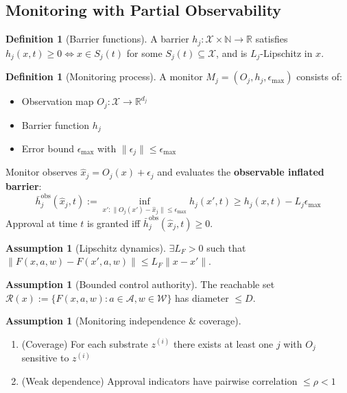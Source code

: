 \documentclass[11pt,a4paper]{article}
\theoremstyle{definition}
\newtheorem{definition}[theorem]{Definition}
\newtheorem{assumption}[theorem]{Assumption}
\newcommand{\R}{\mathbb{R}}
\newcommand{\N}{\mathbb{N}}
\newcommand{\X}{\mathcal{X}}
\newcommand{\A}{\mathcal{A}}
\newcommand{\W}{\mathcal{W}}
\begin{document}
\subsection{Monitoring with Partial Observability}

\begin{definition}[Barrier functions]\label{def:barrier}
A barrier $h_j : \X \times \N \to \R$ satisfies $h_j(x, t) \geq 0 \Leftrightarrow x \in S_j(t)$ for some $S_j(t) \subseteq \X$, and is $L_j$-Lipschitz in $x$.
\end{definition}

\begin{definition}[Monitoring process]\label{def:monitor}
A monitor $M_j = (O_j, h_j, \epsilon_{\max})$ consists of:
\begin{itemize}
\item Observation map $O_j : \X \to \R^{d_j}$
\item Barrier function $h_j$
\item Error bound $\epsilon_{\max}$ with $\|\epsilon_j\| \leq \epsilon_{\max}$
\end{itemize}
Monitor observes $\hat{x}_j = O_j(x) + \epsilon_j$ and evaluates the \textbf{observable inflated barrier}:
\begin{equation}
\bar{h}_j^{\text{obs}}(\hat{x}_j, t) := \inf_{x': \|O_j(x')-\hat{x}_j\|\leq\epsilon_{\max}} h_j(x', t) \geq h_j(x, t) - L_j \epsilon_{\max}
\end{equation}
Approval at time $t$ is granted iff $\bar{h}_j^{\text{obs}}(\hat{x}_j, t) \geq 0$.
\end{definition}

\begin{assumption}[Lipschitz dynamics]\label{ass:lipschitz}
$\exists L_F > 0$ such that $\|F(x, a, w) - F(x', a, w)\| \leq L_F \|x - x'\|$.
\end{assumption}

\begin{assumption}[Bounded control authority]\label{ass:bounded}
The reachable set $\mathcal{R}(x) := \{F(x, a, w) : a \in \A, w \in \W\}$ has diameter $\leq D$.
\end{assumption}

\begin{assumption}[Monitoring independence \& coverage]\label{ass:independence}
\begin{enumerate}
\item (Coverage) For each substrate $z^{(i)}$ there exists at least one $j$ with $O_j$ sensitive to $z^{(i)}$
\item (Weak dependence) Approval indicators have pairwise correlation $\leq \rho < 1$
\end{enumerate}
\end{assumption}
\end{document}
